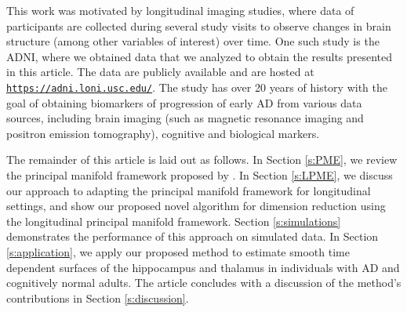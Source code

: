 \documentclass[11pt,reqno]{article}
\theoremstyle{definition}
\begin{document}


This work was motivated by longitudinal imaging studies, where data of participants are collected during several study visits to observe changes in brain structure (among other variables of interest) over time. One such study is the ADNI, where we obtained data that we analyzed to obtain the results presented in this article. The data are publicly available and are hosted at \href{https://adni.loni.usc.edu/}{\texttt{https://adni.loni.usc.edu/}}. The study has over 20 years of history with the goal of obtaining biomarkers of progression of early AD from various data sources, including brain imaging (such as magnetic resonance imaging and positron emission tomography), cognitive and biological markers. 

The remainder of this article is laid out as follows. In Section \ref{s:PME}, we review the principal manifold framework proposed by \cite{mengPrincipalManifoldEstimation2021}. In Section \ref{s:LPME}, we discuss our approach to adapting the principal manifold framework for longitudinal settings, and show our proposed novel  algorithm for dimension reduction using the longitudinal principal manifold framework. Section \ref{s:simulations} demonstrates the performance of this approach on simulated data. In Section \ref{s:application}, we apply our proposed method to estimate smooth time dependent surfaces of the hippocampus and thalamus in individuals with AD and cognitively normal adults. The article concludes with a discussion of the method's contributions in Section \ref{s:discussion}.
\end{document}
